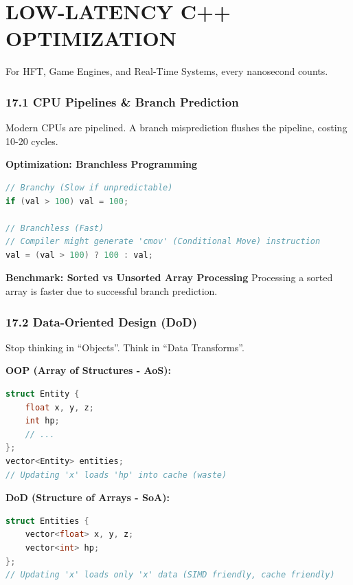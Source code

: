 \hypertarget{low-latency-c-optimization}{%
\chapter{LOW-LATENCY C++
OPTIMIZATION}\label{low-latency-c-optimization}}

For HFT, Game Engines, and Real-Time Systems, every nanosecond counts.

\hypertarget{cpu-pipelines-branch-prediction}{%
\subsection{17.1 CPU Pipelines \& Branch
Prediction}\label{cpu-pipelines-branch-prediction}}

Modern CPUs are pipelined. A branch misprediction flushes the pipeline,
costing 10-20 cycles.

\textbf{Optimization: Branchless Programming}

\begin{lstlisting}[language={C++}]
// Branchy (Slow if unpredictable)
if (val > 100) val = 100;

// Branchless (Fast)
// Compiler might generate 'cmov' (Conditional Move) instruction
val = (val > 100) ? 100 : val;
\end{lstlisting}

\textbf{Benchmark: Sorted vs Unsorted Array Processing} Processing a
sorted array is faster due to successful branch prediction.

\hypertarget{data-oriented-design-dod}{%
\subsection{17.2 Data-Oriented Design
(DoD)}\label{data-oriented-design-dod}}

Stop thinking in ``Objects''. Think in ``Data Transforms''.

\textbf{OOP (Array of Structures - AoS):}

\begin{lstlisting}[language={C++}]
struct Entity {
    float x, y, z;
    int hp;
    // ...
};
vector<Entity> entities; 
// Updating 'x' loads 'hp' into cache (waste)
\end{lstlisting}

\textbf{DoD (Structure of Arrays - SoA):}

\begin{lstlisting}[language={C++}]
struct Entities {
    vector<float> x, y, z;
    vector<int> hp;
};
// Updating 'x' loads only 'x' data (SIMD friendly, cache friendly)
\end{lstlisting}


